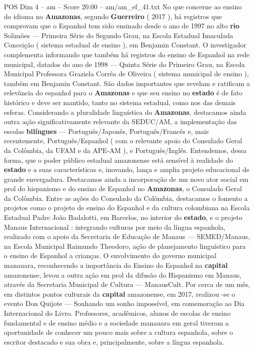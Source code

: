\begin{textsample}{POS Dim 4 – am – Score 20.00 – am/am\_ef\_41.txt}
No que concerne ao ensino do idioma no \textbf{Amazonas}, segundo \textbf{Guerreiro} ( 2017 ), há registros que comprovam que o Espanhol tem sido ensinado desde o ano de 1997 no alto \textbf{rio} Solimões — Primeira Série do Segundo Grau, na Escola Estadual Imaculada Conceição ( sistema estadual de ensino ), em Benjamin Constant.
O investigador complementa informando que também há registros do ensino de Espanhol na rede municipal, datados do ano de 1998 — Quinta Série do Primeiro Grau, na Escola Municipal Professora Graziela Corrêa de Oliveira ( sistema municipal de ensino ), também em Benjamin Constant.
São dados importantes que revelam e ratificam a relevância do espanhol para o \textbf{Amazonas} e que seu ensino no \textbf{estado} é de fato histórico e deve ser mantido, tanto no sistema estadual, como nos das demais esferas.
Considerando a pluralidade linguística do \textbf{Amazonas}, destacamos ainda outra ação significativamente relevante da SEDUC/AM, a implementação das escolas \textbf{bilíngues} — Português/Japonês, Português/Francês e, mais recentemente, Português/Espanhol ( com o relevante apoio do Consulado Geral da Colômbia, da UFAM e da APE-AM ), e Português/Inglês.
Entendemos, dessa forma, que o poder público estadual amazonense está sensível à realidade do \textbf{estado} e a suas características e, inovando, lança e amplia projeto educacional de grande envergadura.
Destacamos ainda a incorporação de um novo ator social em prol do hispanismo e do ensino de Espanhol no \textbf{Amazonas}, o Consulado Geral da Colômbia.
Entre as ações do Consulado da Colômbia, destacamos o fomento a projetos como o projeto de ensino do Espanhol e da cultura colombiana na Escola Estadual Padre João Badalotti, em Barcelos, no interior do \textbf{estado}, e o projeto Manaus Internacional : integrando culturas por meio da língua espanhola, realizado com o apoio da Secretaria de Educação de Manaus — SEMED/Manaus, na Escola Municipal Raimundo Theodoro, ação de planejamento linguístico para o ensino de Espanhol a crianças.
O envolvimento do governo municipal manauara, reconhecendo a importância do Ensino do Espanhol na \textbf{capital} amazonense, levou a outra ação em prol da difusão do Hispanismo em Manaus, através da Secretaria Municipal de Cultura — ManausCult.
Por cerca de um mês, em distintos pontos culturais da \textbf{capital} amazonense, em 2017, realizou -se o evento Don Quijote — Sonhando um sonho impossível, em comemoração ao Dia Internacional do Livro.
Professores, acadêmicos, alunos de escolas de ensino fundamental e de ensino médio e a sociedade manauara em geral tiveram a oportunidade de conhecer um pouco mais sobre a cultura espanhola, sobre o escritor destacado e sua obra e, principalmente, sobre a língua espanhola.

\end{textsample}

